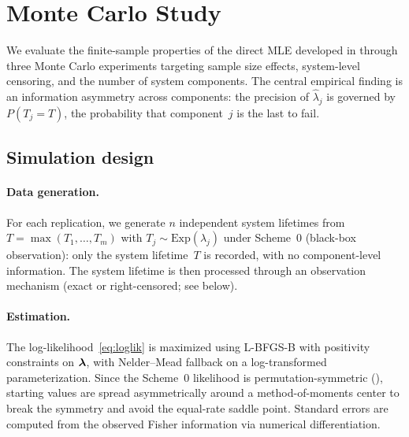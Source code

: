 \section{Monte Carlo Study}
\label{sec:simulations}

We evaluate the finite-sample properties of the direct MLE developed in
 through three Monte Carlo experiments targeting
sample size effects, system-level censoring, and the number of system
components.  The central empirical finding is an information asymmetry
across components: the precision of $\hat{\lambda}_j$ is governed by
$P(T_j = T)$, the probability that component~$j$ is the last to fail.

\subsection{Simulation design}
\label{sec:sim-design}

\paragraph{Data generation.}
For each replication, we generate $n$ independent system lifetimes from
$T = \max(T_1, \ldots, T_m)$ with $T_j \sim \mathrm{Exp}(\lambda_j)$
under Scheme~0 (black-box observation): only the system lifetime~$T$ is
recorded, with no component-level information.
The system lifetime is then processed through an observation mechanism
(exact or right-censored; see below).

\paragraph{Estimation.}
The log-likelihood~\eqref{eq:loglik} is maximized using L-BFGS-B
with positivity constraints on $\boldsymbol{\lambda}$, with Nelder--Mead fallback on a
log-transformed parameterization.  Since the Scheme~0 likelihood is
permutation-symmetric (), starting values
are spread asymmetrically around a method-of-moments center to break
the symmetry and avoid the equal-rate saddle point.  Standard errors
are computed from the observed Fisher information via numerical
differentiation.


